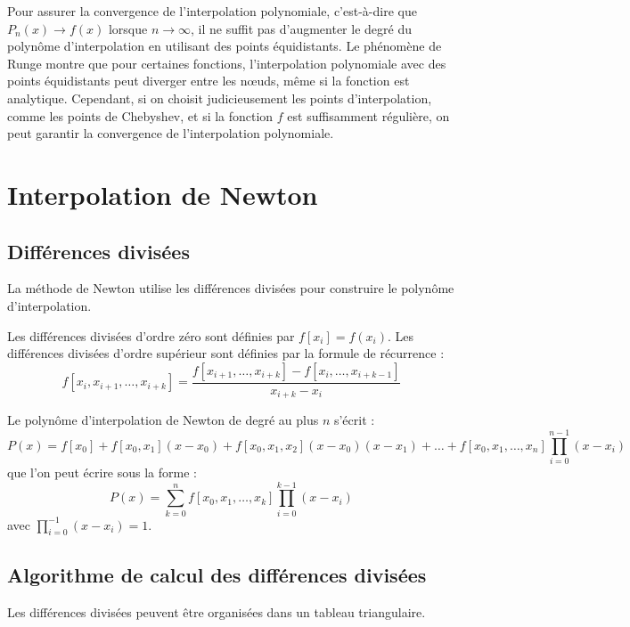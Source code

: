\documentclass[oneside]{book}
\begin{document}
Pour assurer la convergence de l'interpolation polynomiale, c'est-à-dire que $P_n(x) \to f(x)$ lorsque $n \to \infty$, il ne suffit pas d'augmenter le degré du polynôme d'interpolation en utilisant des points équidistants. Le phénomène de Runge montre que pour certaines fonctions, l'interpolation polynomiale avec des points équidistants peut diverger entre les nœuds, même si la fonction est analytique.  Cependant, si on choisit judicieusement les points d'interpolation, comme les points de Chebyshev, et si la fonction $f$ est suffisamment régulière, on peut garantir la convergence de l'interpolation polynomiale.

\section{Interpolation de Newton}

\subsection{Différences divisées}

La méthode de Newton utilise les différences divisées pour construire le polynôme d'interpolation.

\begin{definition}
Les différences divisées d'ordre zéro sont définies par $f[x_i] = f(x_i)$. Les différences divisées d'ordre supérieur sont définies par la formule de récurrence :
\[
f[x_i, x_{i+1}, \dots, x_{i+k}] = \frac{f[x_{i+1}, \dots, x_{i+k}] - f[x_i, \dots, x_{i+k-1}]}{x_{i+k} - x_i}
\]
\end{definition}

\begin{proposition}
Le polynôme d'interpolation de Newton de degré au plus $n$ s'écrit :
\[
P(x) = f[x_0] + f[x_0, x_1](x - x_0) + f[x_0, x_1, x_2](x - x_0)(x - x_1) + \dots + f[x_0, x_1, \dots, x_n] \prod_{i=0}^{n-1} (x - x_i)
\]
que l'on peut écrire sous la forme :
\[
P(x) = \sum_{k=0}^{n} f[x_0, x_1, \dots, x_k] \prod_{i=0}^{k-1} (x - x_i)
\]
avec $\prod_{i=0}^{-1} (x - x_i) = 1$.
\end{proposition}

\subsection{Algorithme de calcul des différences divisées}

Les différences divisées peuvent être organisées dans un tableau triangulaire.
\end{document}
